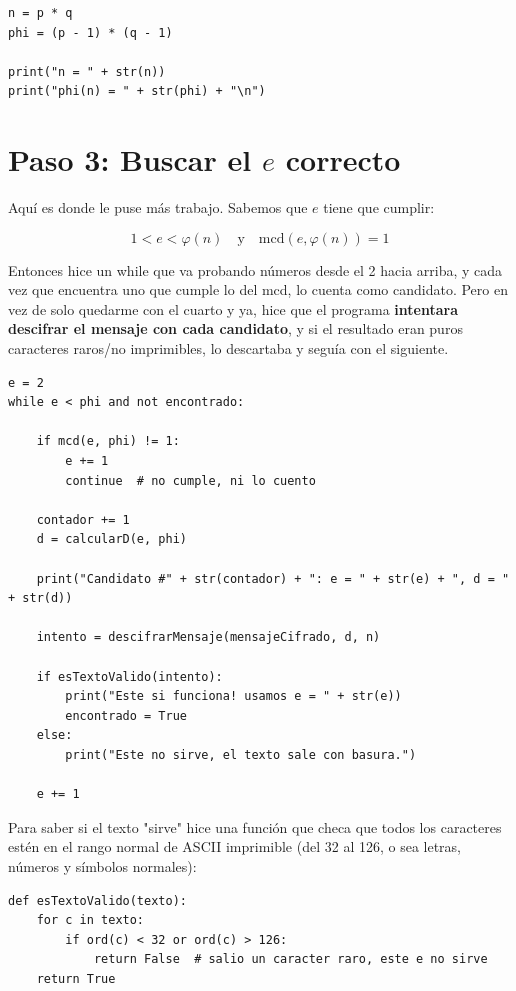 \documentclass[11pt]{article}
\begin{document}
\begin{lstlisting}
n = p * q
phi = (p - 1) * (q - 1)

print("n = " + str(n))
print("phi(n) = " + str(phi) + "\n")
\end{lstlisting}

\section{Paso 3: Buscar el $e$ correcto}

Aquí es donde le puse más trabajo. Sabemos que $e$ tiene que
cumplir:

\[
1 < e < \varphi(n) \quad \text{y} \quad \mathrm{mcd}(e, \varphi(n)) = 1
\]

Entonces hice un while que va probando números desde el 2 hacia arriba, y
cada vez que encuentra uno que cumple lo del mcd, lo cuenta como candidato.
Pero en vez de solo quedarme con el cuarto y ya, hice que el programa
\textbf{intentara descifrar el mensaje con cada candidato}, y si el
resultado eran puros caracteres raros/no imprimibles, lo descartaba y seguía
con el siguiente.

\begin{lstlisting}
e = 2
while e < phi and not encontrado:

    if mcd(e, phi) != 1:
        e += 1
        continue  # no cumple, ni lo cuento

    contador += 1
    d = calcularD(e, phi)

    print("Candidato #" + str(contador) + ": e = " + str(e) + ", d = " + str(d))

    intento = descifrarMensaje(mensajeCifrado, d, n)

    if esTextoValido(intento):
        print("Este si funciona! usamos e = " + str(e))
        encontrado = True
    else:
        print("Este no sirve, el texto sale con basura.")

    e += 1
\end{lstlisting}

Para saber si el texto "sirve" hice una función que checa que todos los
caracteres estén en el rango normal de ASCII imprimible (del 32 al 126,
o sea letras, números y símbolos normales):

\begin{lstlisting}
def esTextoValido(texto):
    for c in texto:
        if ord(c) < 32 or ord(c) > 126:
            return False  # salio un caracter raro, este e no sirve
    return True
\end{lstlisting}
\end{document}
